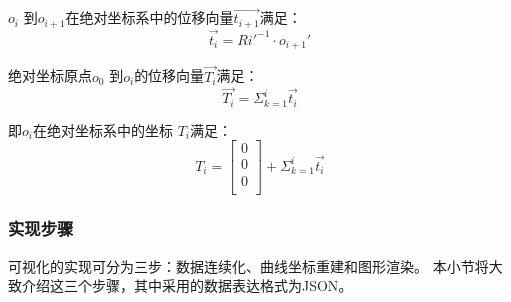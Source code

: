 \begin{itemize}
$o_i$ 到$o_{i+1}$在绝对坐标系中的位移向量$\vec{t_{i+1}}$满足：
    \begin{equation}
    \vec{t_i} = Ri'^{-1}\cdot o_{i+1}'
    \end{equation}

绝对坐标原点$o_0$ 到$o_i$的位移向量$\vec{T_i}$满足：
    \begin{equation}
    \vec{T_i} = \Sigma_{k=1} ^ {i} \vec{t_i}
    \end{equation}

即$o_i$在绝对坐标系中的坐标 $T_i$满足\cite{用于光纤光栅曲线重建算法的坐标点拟合}：
\begin{equation}
T_i = \left[
    \begin{matrix}
    0\\
    0\\
    0\\
  	\end{matrix}
  \right]
  + \Sigma_{k=1} ^ {i} \vec{t_i}
\end{equation}

\end{itemize}

\subsubsection{实现步骤}

可视化的实现可分为三步：数据连续化、曲线坐标重建和图形渲染。
本小节将大致介绍这三个步骤，其中采用的数据表达格式为JSON\cite{rfc7159}。

